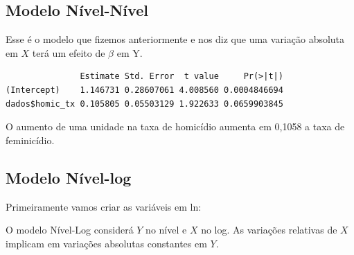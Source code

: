 \documentclass[
  letterpaper,
  DIV=11,
  numbers=noendperiod]{scrreprt}
\newenvironment{Shaded}{\begin{snugshade}}{\end{snugshade}}
\newcommand{\AttributeTok}[1]{\textcolor[rgb]{0.40,0.45,0.13}{#1}}
\newcommand{\FunctionTok}[1]{\textcolor[rgb]{0.28,0.35,0.67}{#1}}
\newcommand{\NormalTok}[1]{\textcolor[rgb]{0.00,0.23,0.31}{#1}}
\newcommand{\OtherTok}[1]{\textcolor[rgb]{0.00,0.23,0.31}{#1}}
\newcommand{\SpecialCharTok}[1]{\textcolor[rgb]{0.37,0.37,0.37}{#1}}
\begin{document}
\subsection{Modelo Nível-Nível}\label{modelo-nuxedvel-nuxedvel}

Esse é o modelo que fizemos anteriormente e nos diz que uma variação
absoluta em \(X\) terá um efeito de \(\beta\) em Y.

\begin{Shaded}
\end{Shaded}

\begin{verbatim}
               Estimate Std. Error  t value     Pr(>|t|)
(Intercept)    1.146731 0.28607061 4.008560 0.0004846694
dados$homic_tx 0.105805 0.05503129 1.922633 0.0659903845
\end{verbatim}

O aumento de uma unidade na taxa de homicídio aumenta em 0,1058 a taxa
de feminicídio.

\subsection{Modelo Nível-log}\label{modelo-nuxedvel-log}

Primeiramente vamos criar as variáveis em ln:

\begin{Shaded}
\end{Shaded}

O modelo Nível-Log considerá \(Y\) no nível e \(X\) no log. As variações
relativas de \(X\) implicam em variações absolutas constantes em \(Y\).
\end{document}
